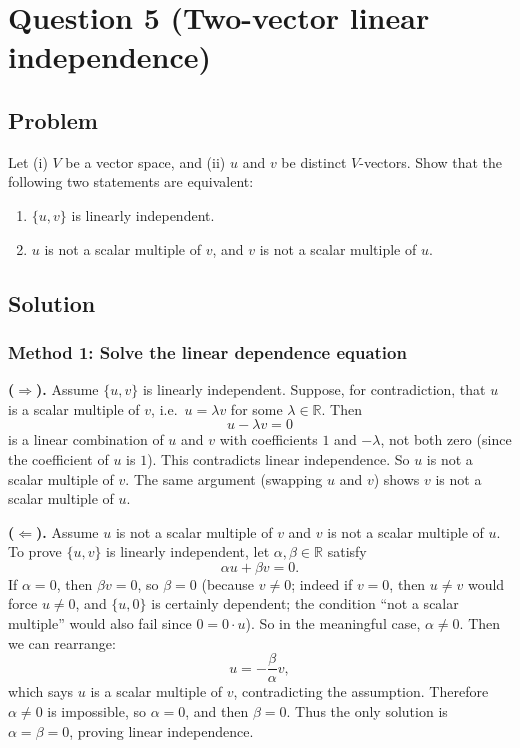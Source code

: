 \documentclass[12pt]{article}
\newcommand{\R}{\mathbb{R}}
\begin{document}
\section{Question 5 (Two-vector linear independence)}
\subsection{Problem}
Let (i) \(V\) be a vector space, and (ii) \(u\) and \(v\) be distinct \(V\)-vectors.
Show that the following two statements are equivalent:
\begin{enumerate}[label=(\alph*)]
\item \(\{u,v\}\) is linearly independent.
\item \(u\) is not a scalar multiple of \(v\), and \(v\) is not a scalar multiple of \(u\).
\end{enumerate}

\subsection{Solution}

\subsubsection{Method 1: Solve the linear dependence equation}
\textbf{(\(\Rightarrow\)).}
Assume \(\{u,v\}\) is linearly independent.
Suppose, for contradiction, that \(u\) is a scalar multiple of \(v\), i.e.\ \(u=\lambda v\) for some \(\lambda\in\R\).
Then
\[
u-\lambda v=0
\]
is a linear combination of \(u\) and \(v\) with coefficients \(1\) and \(-\lambda\), not both zero (since the coefficient of \(u\) is \(1\)).
This contradicts linear independence.
So \(u\) is not a scalar multiple of \(v\).
The same argument (swapping \(u\) and \(v\)) shows \(v\) is not a scalar multiple of \(u\).

\textbf{(\(\Leftarrow\)).}
Assume \(u\) is not a scalar multiple of \(v\) and \(v\) is not a scalar multiple of \(u\).
To prove \(\{u,v\}\) is linearly independent, let \(\alpha,\beta\in\R\) satisfy
\[
\alpha u+\beta v=0.
\]
If \(\alpha=0\), then \(\beta v=0\), so \(\beta=0\) (because \(v\neq 0\); indeed if \(v=0\), then \(u\neq v\) would force \(u\neq 0\), and \(\{u,0\}\) is certainly dependent; the condition ``not a scalar multiple'' would also fail since \(0=0\cdot u\)).
So in the meaningful case, \(\alpha\neq 0\).
Then we can rearrange:
\[
u = -\frac{\beta}{\alpha} v,
\]
which says \(u\) is a scalar multiple of \(v\), contradicting the assumption.
Therefore \(\alpha\neq 0\) is impossible, so \(\alpha=0\), and then \(\beta=0\).
Thus the only solution is \(\alpha=\beta=0\), proving linear independence.
\end{document}
